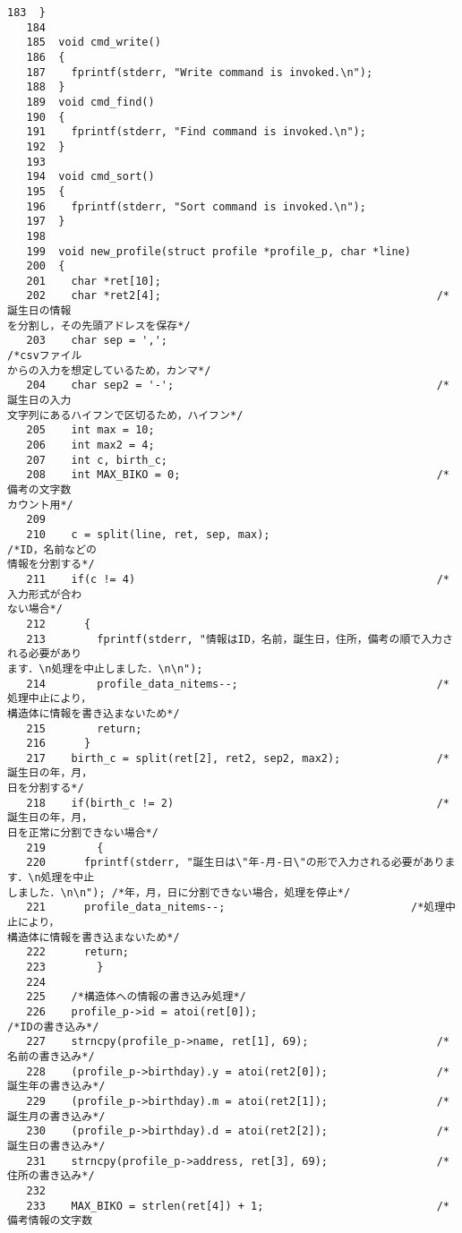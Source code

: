 \begin{Verbatim}[fontsize=\small, baselinestretch=0.8]
   183	}
   184	
   185	void cmd_write()
   186	{
   187	  fprintf(stderr, "Write command is invoked.\n");
   188	}
   189	void cmd_find()
   190	{
   191	  fprintf(stderr, "Find command is invoked.\n");
   192	}
   193	
   194	void cmd_sort()
   195	{
   196	  fprintf(stderr, "Sort command is invoked.\n");
   197	}
   198	
   199	void new_profile(struct profile *profile_p, char *line)
   200	{
   201	  char *ret[10];
   202	  char *ret2[4];                                           /*誕生日の情報
を分割し，その先頭アドレスを保存*/
   203	  char sep = ',';                                          /*csvファイル
からの入力を想定しているため，カンマ*/
   204	  char sep2 = '-';                                         /*誕生日の入力
文字列にあるハイフンで区切るため，ハイフン*/
   205	  int max = 10;
   206	  int max2 = 4;
   207	  int c, birth_c;
   208	  int MAX_BIKO = 0;                                        /*備考の文字数
カウント用*/
   209	  
   210	  c = split(line, ret, sep, max);                          /*ID，名前などの
情報を分割する*/
   211	  if(c != 4)                                               /*入力形式が合わ
ない場合*/
   212	    {
   213	      fprintf(stderr, "情報はID，名前，誕生日，住所，備考の順で入力される必要があり
ます．\n処理を中止しました．\n\n");
   214	      profile_data_nitems--;                               /*処理中止により，
構造体に情報を書き込まないため*/
   215	      return;
   216	    }
   217	  birth_c = split(ret[2], ret2, sep2, max2);               /*誕生日の年，月，
日を分割する*/
   218	  if(birth_c != 2)                                         /*誕生日の年，月，
日を正常に分割できない場合*/
   219	      {
   220		fprintf(stderr, "誕生日は\"年-月-日\"の形で入力される必要があります．\n処理を中止
しました．\n\n"); /*年，月，日に分割できない場合，処理を停止*/
   221		profile_data_nitems--;                             /*処理中止により，
構造体に情報を書き込まないため*/
   222		return;
   223	      }
   224	
   225	  /*構造体への情報の書き込み処理*/
   226	  profile_p->id = atoi(ret[0]);                            /*IDの書き込み*/
   227	  strncpy(profile_p->name, ret[1], 69);                    /*名前の書き込み*/
   228	  (profile_p->birthday).y = atoi(ret2[0]);                 /*誕生年の書き込み*/
   229	  (profile_p->birthday).m = atoi(ret2[1]);                 /*誕生月の書き込み*/
   230	  (profile_p->birthday).d = atoi(ret2[2]);                 /*誕生日の書き込み*/
   231	  strncpy(profile_p->address, ret[3], 69);                 /*住所の書き込み*/
   232	
   233	  MAX_BIKO = strlen(ret[4]) + 1;                           /*備考情報の文字数

\end{Verbatim}
